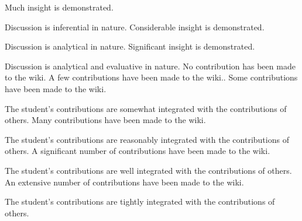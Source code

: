 \documentclass{../../fal_assignment}
\begin{document}
\begin{markingrubric}
		\grade		Much insight is demonstrated.
		\par		Discussion is inferential in nature.
		\grade		Considerable insight is demonstrated.
		\par		Discussion is analytical in nature.
		\grade		Significant insight is demonstrated.
		\par		Discussion is analytical and evaluative in nature.
		\grade\fail 	No contribution has been made to the wiki.
		\grade 		A few contributions have been made to the wiki..
		\grade 		Some contributions have been made to the wiki.
		\par		The student's contributions are somewhat integrated with the contributions of others.
		\grade 		Many contributions have been made to the wiki.
		\par		The student's contributions are reasonably integrated with the contributions of others.
		\grade 		A significant number of contributions have been made to the wiki.
		\par		The student's contributions are well integrated with the contributions of others.
		\grade 		An extensive number of contributions have been made to the wiki.
		\par		The student's contributions are tightly integrated with the contributions of others.
	\end{markingrubric}
\end{document}
